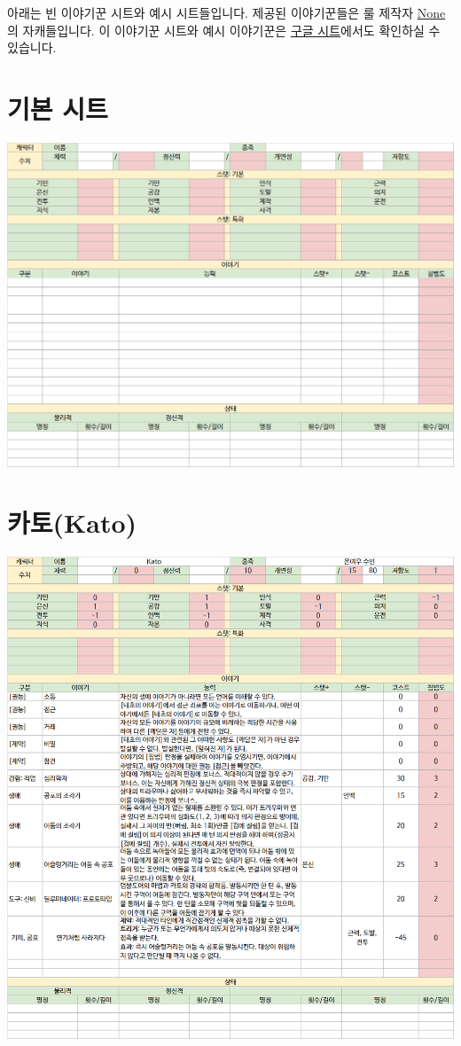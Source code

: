 \documentclass{report}
\begin{document}
	아래는 빈 이야기꾼 시트와 예시 시트들입니다. 제공된 이야기꾼들은 룰 제작자 \href{https://www.twitter.com/n0n3x1573n7_WS}{None}의 자캐들입니다. 이 이야기꾼 시트와 예시 이야기꾼은 \href{https://docs.google.com/spreadsheets/d/1g3ZO-oALMVbytbE2tvSBdT6czxB32XHZ1crWIGavEhQ/edit?usp=sharing}{구글 시트}에서도 확인하실 수 있습니다.
	
	\section*{기본 시트}
		\includegraphics[width=\textwidth]{./Chapters/WoS/sheets/base.png}
	
	\section*{카토(Kato)}
		\includegraphics[width=\textwidth]{./Chapters/WoS/sheets/kato.png}
	
\end{document}

